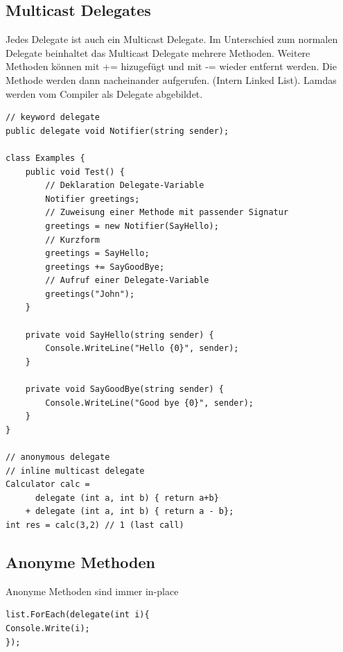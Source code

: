 \subsection{Multicast Delegates}
Jedes Delegate ist auch ein Multicast Delegate. Im Unterschied zum normalen Delegate beinhaltet das Multicast Delegate mehrere Methoden. Weitere Methoden können mit += hizugefügt und mit -= wieder entfernt werden. Die Methode werden dann nacheinander aufgerufen. (Intern Linked List). Lamdas werden vom Compiler als Delegate abgebildet.
\begin{lstlisting}
// keyword delegate
public delegate void Notifier(string sender);

class Examples {
	public void Test() {
		// Deklaration Delegate-Variable
		Notifier greetings; 
		// Zuweisung einer Methode mit passender Signatur
		greetings = new Notifier(SayHello); 
		// Kurzform
		greetings = SayHello;
		greetings += SayGoodBye;
		// Aufruf einer Delegate-Variable
		greetings("John");
	}

	private void SayHello(string sender) {
		Console.WriteLine("Hello {0}", sender);
	}
	
	private void SayGoodBye(string sender) {
		Console.WriteLine("Good bye {0}", sender);
	}
} 

// anonymous delegate
// inline multicast delegate
Calculator calc =  
	  delegate (int a, int b) { return a+b}
	+ delegate (int a, int b) { return a - b};
int res = calc(3,2) // 1 (last call)
\end{lstlisting}

\subsection{Anonyme Methoden}
Anonyme Methoden sind immer in-place
\begin{lstlisting}
list.ForEach(delegate(int i){
Console.Write(i);
});
\end{lstlisting}

\clearpage

